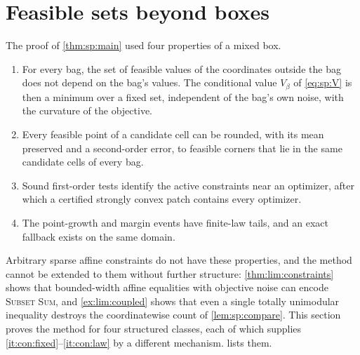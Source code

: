 \section{Feasible sets beyond boxes}\label{sec:con}

The proof of \cref{thm:sp:main} used four properties of a mixed box.
\begin{enumerate}[label=(P\arabic*)]
\item\label{it:con:fixed} For every bag, the set of feasible values of the
coordinates outside the bag does not depend on the bag's values. The
conditional value $V_\beta$ of \eqref{eq:sp:V} is then a minimum over a fixed
set, independent of the bag's own noise, with the curvature of the objective.
\item\label{it:con:round} Every feasible point of a candidate cell can be
rounded, with its mean preserved and a second-order error, to feasible
corners that lie in the same candidate cells of every bag.
\item\label{it:con:close} Sound first-order tests identify the active
constraints near an optimizer, after which a certified strongly convex patch
contains every optimizer.
\item\label{it:con:law} The point-growth and margin events have finite-law
tails, and an exact fallback exists on the same domain.
\end{enumerate}
Arbitrary sparse affine constraints do not have these properties, and the
method cannot be extended to them without further structure:
\cref{thm:lim:constraints} shows that bounded-width affine equalities with
objective noise can encode \textsc{Subset Sum}, and \cref{ex:lim:coupled}
shows that even a single totally unimodular inequality destroys the
coordinatewise count of \cref{lem:sp:compare}. This section proves the
method for four structured classes, each of which supplies
\ref{it:con:fixed}--\ref{it:con:law} by a different mechanism.
 lists them.

